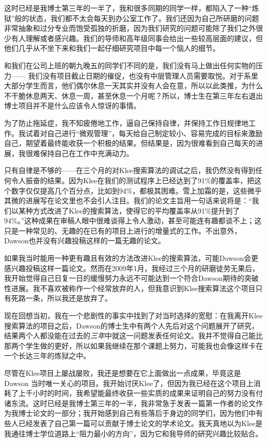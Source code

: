 \documentclass[letter,12pt]{book}
\begin{document}
\begin{CJK}{UTF8}{gbsn}
这时已经是我博士第三年的一半了，我和很多同期的同学一样，都陷入了一种“炼狱”般的状态，我们都不太会每天到办公室工作了。我们还因为自己所研磨的问题非常抽象和过分专业而饱受孤独的折磨，因为我们研究的问题可能除了我们之外很少有人理解或者感兴趣。我们的导师和高年级同事会给出一些较高层面的建议，但他们几乎从不坐下来和我们一起仔细研究项目中每一个恼人的细节。

和我们在公司上班的朝九晚五的同学们不同的是，我们没有马上做出任何实物的压力—— 我们没有项目截止日期的催促，也没有中层管理人员需要取悦。对于系里大部分学生而言，他们偶尔休息一天其实并没有人会在意，所以以此类推，为什么不干脆休息两天、休息一周，甚至休息一个月呢？所以，博士生在第三年左右退出博士项目并不是什么应该令人惊讶的事情。

为了防止拖延症，我不知疲倦地工作，逼自己保持自律，并保持工作日规律地工作。我试着对自己进行“微观管理”，每天给自己制定较小、容易完成的目标来激励自己，期望着最终能收获一个积极的结果。但结果是，因为很难看到自己每天的进展，我很难保持自己在工作中充满动力。

只有自律是不够的——在三个月的对Klee搜索算法的调试之后，我仍然没有得到任何令人振奋的结果。因为Klee在我们的测试程序上已经达到了91\%的覆盖率，把这个数字仅仅提高几个百分点，比如到94\%，都极其困难。雪上加霜的是，这些微乎其微的进展写在论文里也不会引人注目。我们的论文主旨用一句话来说将是：“我们以某种方式改进了Klee的搜索算法，使得它的平均覆盖率从91\%提升到了94\%。”这种成果在审稿人眼中很难谈得上令人激动，甚至可能连有趣都谈不上；这只是一种常见的、无趣的在已有的项目上进行的增量式的工作。不出意外，Dawson也并没有兴趣投稿这样的一篇无趣的论文。

如果我当时能用一种更有趣且有效的方法改进Klee的搜索算法，可能Dawson会更感兴趣投稿这样一篇论文。然而在2009年1月，我经过三个月的研磨徒劳无果后，我开始觉得自己日复一日的缓慢努力永远不可能达到一个符合Dawson期待的突破性进展。我不喜欢被称作一个经常放弃的人，但我意识到Klee搜索算法这个项目只有死路一条，所以我还是放弃了。

现在回想当初，我在一个悲剧性的事实中找到了对当时选择的宽慰：在我离开Klee 搜索算法的项目之后，Dawson的博士生中有两个人先后对这个问题展开了研究，结果两个人都没能在过去的\emph{三年}中就这一问题发表任何论文。我并不觉得自己能比那两个学生做的更好，所以如果我继续在那个课题上努力，可能我也会像这样卡在一个长达三年的炼狱之中。

\breakline

尽管在Klee项目上屡战屡败，我还是想要在它上面做出一点成果，毕竟这是Dawson 当时唯一关心的项目。我开始讨厌Klee了，但因为我已经在这个项目上消耗了上千小时的时间，我希望能最终收获一些实质的成果来证明自己的努力没有付诸东流。这时已经是我博士第三年的一半，我非常急于发表一篇第一作者的论文作为我博士论文的一部分；我开始感到自己有些落后于身边的同学们，因为他们中有些人已经发表了自己第一篇可以贡献于博士论文的学术论文。我天真地以为Klee是我通往博士学位道路上“阻力最小的方向”，因为它和我导师的研究兴趣比较贴合。


\end{CJK}
\end{document}
